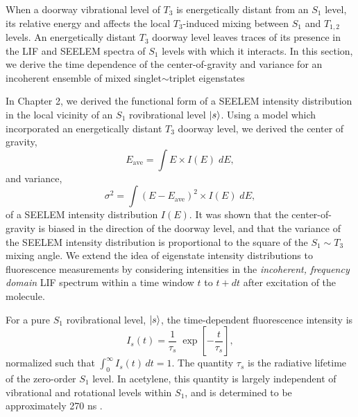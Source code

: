 \documentclass[12pt]{mitthesis}
\begin{document}
When a doorway vibrational level of $T_3$ is energetically distant
from an $S_1$ level, its relative energy and affects the local
$T_3$-induced mixing between $S_1$ and $T_{1,2}$ levels.  An
energetically distant $T_3$ doorway level leaves traces of its
presence in the LIF and SEELEM spectra of $S_1$ levels with which it
interacts.  In this section, we derive the time dependence of the
center-of-gravity and variance for an incoherent ensemble of mixed
singlet$\sim$triplet eigenstates

In Chapter 2, we derived the functional form of a SEELEM intensity
distribution in the local vicinity of an $S_1$ rovibrational level
$\mathinner{|{s}\rangle}$.  Using a model which incorporated an energetically distant
$T_3$ doorway level, we derived the center of gravity,
\begin{equation}
  E_{\text{ave}} = \int E \times I(E) \; dE,
\end{equation}
and variance,
\begin{equation}
  \sigma^2 = \int (E - E_{\text{ave}})^2 \times I(E) \; dE,
\end{equation}
of a SEELEM intensity distribution $I(E)$.  It was shown that the
center-of-gravity is biased in the direction of the doorway level, and
that the variance of the SEELEM intensity distribution is proportional
to the square of the $S_1 \sim T_3$ mixing angle.  We extend the idea
of eigenstate intensity distributions to fluorescence measurements by
considering intensities in the \emph{incoherent, frequency domain} LIF
spectrum within a time window $t$ to $t+dt$ after excitation of the
molecule.

For a pure $S_1$ rovibrational level, $\mathinner{|{s}\rangle}$, the time-dependent
fluorescence intensity is
\begin{equation}
  I_s(t) = \frac{1}{\tau_s} \;
           \exp \left[
             -\frac{t}{ \tau_s} 
           \right],
\end{equation}
normalized such that $\int_0^{\infty} I_s(t) \, dt = 1$.  The quantity
$\tau_s$ is the radiative lifetime of the zero-order $S_1$ level.  In
acetylene, this quantity is largely independent of vibrational and
rotational levels within $S_1$, and is determined to be approximately
270 ns \cite{ochi91, stephenson84}.
\end{document}
